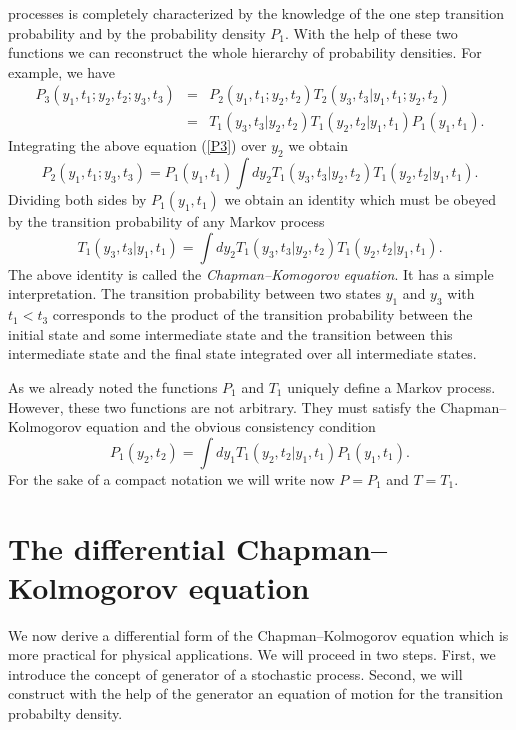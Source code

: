 processes is completely characterized by the knowledge of the
one step transition probability and by the probability density
$P_1$. With the help of these two functions we can reconstruct the 
whole hierarchy of probability densities. For example, we
have
\begin{eqnarray}
\label{P3}
P_3(y_1,t_1;y_2,t_2;y_3,t_3) &=& 
      P_2(y_1,t_1;y_2,t_2) T_2(y_3,t_3|y_1,t_1;y_2,t_2)   
         \nonumber \\
    & = & T_1(y_3,t_3|y_2,t_2) T_1(y_2,t_2|y_1,t_1)
           P_1(y_1,t_1).
\end{eqnarray}
Integrating the above equation (\ref{P3}) over $y_2$ we obtain 
\begin{equation}
P_2(y_1,t_1;y_3,t_3) = P_1(y_1,t_1) 
       \int dy_2 T_1(y_3,t_3|y_2,t_2) T_1(y_2,t_2|y_1,t_1).
\end{equation}
Dividing both sides by $P_1(y_1,t_1)$ we obtain an identity which 
must be obeyed by the transition probability of any Markov process
\begin{equation}
\label{CHAPMAN_KOLMOGOROV}
T_1(y_3,t_3|y_1,t_1) =  
       \int dy_2 T_1(y_3,t_3|y_2,t_2) T_1(y_2,t_2|y_1,t_1).
\end{equation}
The above identity is called the {\em Chapman--Komogorov 
equation}. It has a simple interpretation. The transition 
probability between two states $y_1$ and $y_3$ with $t_1 <t_3$
corresponds to the product of the transition probability between 
the initial state and some intermediate state and the transition 
between this intermediate state and the final state integrated
over all intermediate states.

As we already noted the functions $P_1$ and $T_1$ uniquely define 
a Markov process. However, these two functions are not arbitrary.
They must satisfy the Chapman--Kolmogorov equation and the obvious
consistency condition
\begin{equation}
\label{CONSISTENCY}
P_1(y_2,t_2) =  
       \int dy_1  T_1(y_2,t_2|y_1,t_1) P_1(y_1,t_1).
\end{equation}
For the sake of a compact notation we will write now $P=P_1$ and 
$T=T_1$.


\section{The differential Chapman--Kolmogorov equation}
We now derive a differential  form of the Chapman--Kolmogorov 
equation which is more practical for physical applications.
We will proceed in two steps. First, we introduce the concept
of generator of a stochastic process. Second, we will construct
with the help of the generator an equation of motion for the
transition probabilty density.


